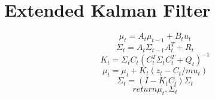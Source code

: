 \section{Extended Kalman Filter}
\label{EKF}




\begin{equation}
\mu_{t}=A_t \mu_{t-1} + B_t u_t
\end{equation}
\begin{equation}
\Sigma_{t}=A_t \Sigma_{t-1} A_t^T +R_t
\end{equation}
\begin{equation}
K_t = \Sigma_{t} C_t(C_t^T \Sigma_{t}C_t^T+Q_t)^{-1}
\end{equation}
\begin{equation}
\mu_{t}=\mu_{t}+K_t(z_t-C_t /mu_t)
\end{equation}
\begin{equation}
\Sigma_{t}=(I-K_t C_t)\Sigma_{t}
\end{equation}
\begin{equation}
return  \mu_t ,  \Sigma_t
\end{equation} 